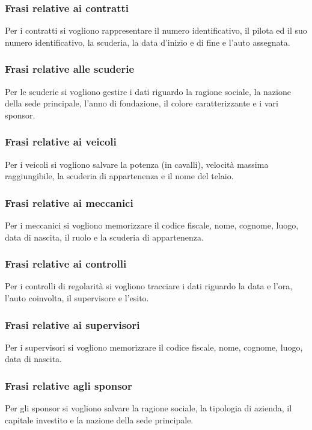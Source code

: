 \documentclass[11pt]{article}
\begin{document}
\subsubsection*{Frasi relative ai contratti}
Per i contratti si vogliono rappresentare il numero identificativo, il pilota ed il suo numero identificativo, la scuderia, 
la data d'inizio e di fine e l'auto assegnata.

\subsubsection*{Frasi relative alle scuderie}
Per le scuderie si vogliono gestire i dati riguardo la ragione sociale, la nazione della sede principale, l'anno di fondazione, il colore caratterizzante e i vari sponsor.

\subsubsection*{Frasi relative ai veicoli}
Per i veicoli si vogliono salvare la potenza (in cavalli), velocità massima raggiungibile, la scuderia di appartenenza e il nome del telaio.

\subsubsection*{Frasi relative ai meccanici}
Per i meccanici si vogliono memorizzare il codice fiscale, nome, cognome, luogo, data di nascita, il ruolo e la scuderia di appartenenza.

\subsubsection*{Frasi relative ai controlli}
Per i controlli di regolarità si vogliono tracciare i dati riguardo la data e l'ora, l'auto coinvolta, il supervisore e l'esito.

\subsubsection*{Frasi relative ai supervisori}
Per i supervisori si vogliono memorizzare il codice fiscale, nome, cognome, luogo, data di nascita.

\subsubsection*{Frasi relative agli sponsor}
Per gli sponsor si vogliono salvare la ragione sociale, la tipologia di azienda, il capitale investito e la nazione della sede principale.
\end{document}
